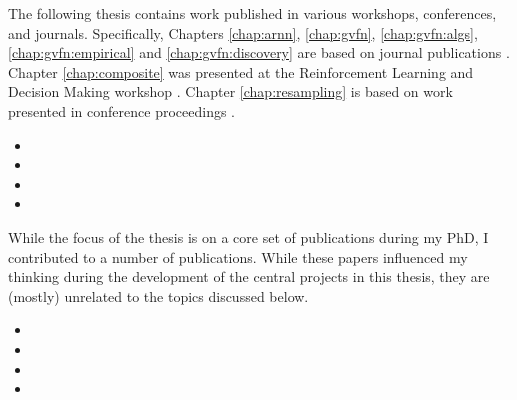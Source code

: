 \documentclass[\main/thesis.tex]{subfiles}
\begin{document}
\begin{preface}

The following thesis contains work published in various workshops, conferences, and journals.
Specifically, Chapters \ref{chap:arnn}, \ref{chap:gvfn}, \ref{chap:gvfn:algs}, \ref{chap:gvfn:empirical} and \ref{chap:gvfn:discovery} are based on journal publications \cite{schlegel2021general, schlegel2022investigating}. Chapter \ref{chap:composite} was presented at the Reinforcement Learning and Decision Making workshop \cite{schlegel2022predictions}. Chapter \ref{chap:resampling} is based on work presented in conference proceedings \cite{schlegel2019importance}.

\begin{itemize}
\item[\cite{schlegel2019importance}] 
\item[\cite{schlegel2021general}] 
\item[\cite{schlegel2022predictions}] 
\item[\cite{schlegel2022investigating}] 
\end{itemize}

While the focus of the thesis is on a core set of publications during
my PhD, I contributed to a number of publications. While these papers
influenced my thinking during the development of the central projects
in this thesis, they are (mostly) unrelated to the topics discussed
below.

\begin{itemize}
\item[\cite{kumaraswamy2018context}] 
\item[\cite{jacobsen2019meta}] 
\item[\cite{gupta2021structural}] 
\item[\cite{mcleod2021continual}] 
\end{itemize}

\end{preface}
\end{document}
